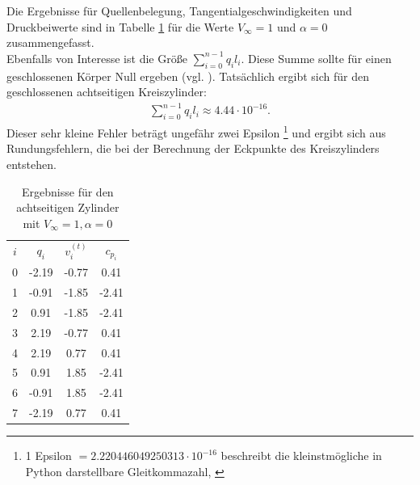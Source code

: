 Die Ergebnisse für Quellenbelegung, Tangentialgeschwindigkeiten und Druckbeiwerte sind in Tabelle \ref{tab:cyl8} für die Werte $V_{\infty} = 1$ und $\alpha  = 0$ zusammengefasst. \\
Ebenfalls von Interesse ist die Größe $\sum_{i=0}^{n-1} q_i l_i$. Diese Summe sollte für einen geschlossenen Körper Null ergeben (vgl. \cite{Barba:2019}). Tatsächlich ergibt sich für den geschlossenen achtseitigen Kreiszylinder:
\begin{align*}
\sum_{i=0}^{n-1} q_i l_i \approx 4.44 \cdot 10^{-16}.
\end{align*}
Dieser sehr kleine Fehler beträgt ungefähr zwei Epsilon \footnote{1 Epsilon $=2.220446049250313 \cdot 10^{-16}$ beschreibt die kleinstmögliche in Python darstellbare Gleitkommazahl, \cite{python2009}} und ergibt sich aus Rundungsfehlern, die bei der Berechnung der Eckpunkte des Kreiszylinders entstehen.

\begin{table}
\caption{Ergebnisse für den achtseitigen Zylinder mit $V_{\infty} = 1, \alpha  = 0$}
\label{tab:cyl8}
\begin{center}
\begin{tabular}{c|ccc}
$i$ & $q_i$ & $v_i^{(t)}$ & $c_{p_i}$ \\
0 & -2.19 & -0.77 & 0.41 \\
1 & -0.91 & -1.85 & -2.41 \\
2 & 0.91 & -1.85 & -2.41 \\
3 & 2.19 & -0.77 & 0.41 \\
4 & 2.19 & 0.77 &  0.41 \\ 
5 &  0.91 & 1.85 & -2.41 \\
6 & -0.91 & 1.85 & -2.41 \\
7 & -2.19 &0.77 & 0.41
\end{tabular}
\end{center}
\end{table}

